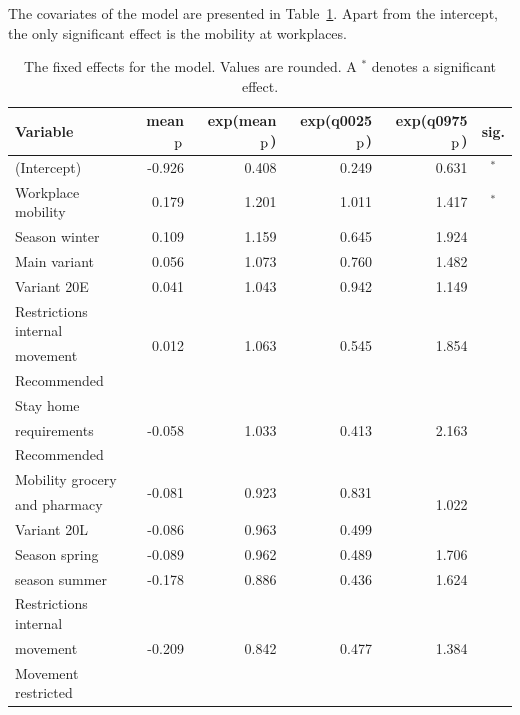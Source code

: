 The covariates of the model are presented in Table~\ref{fixed_norway_temporal}. Apart from the intercept, the only significant effect is the mobility at workplaces.
\begin{table}[H]
\caption{The fixed effects for the model. Values are rounded. A $^*$ denotes a significant effect. \label{fixed_norway_temporal}}
\begin{tabular}{l r r r r c}
\toprule
\textbf{Variable}	& \textbf{mean$_{\hbox{p}}$}	& \textbf{exp(mean$_{\hbox{p}}$)} & \textbf{exp(q0025$_{\hbox{p}}$)} & \textbf{exp(q0975$_{\hbox{p}}$)} & \textbf{sig.}\\
\midrule
(Intercept) & -0.926 & 0.408 & 0.249 & 0.631 & $^*$ \\
Workplace mobility & 0.179 & 1.201 & 1.011 & 1.417 & $^*$ \\
Season winter & 0.109 & 1.159 & 0.645 & 1.924 \\
Main variant & 0.056 & 1.073 & 0.760 & 1.482 \\
Variant 20E & 0.041 & 1.043 & 0.942 & 1.149 \\
Restrictions internal & \multirow{3}{*}{0.012} & \multirow{3}{*}{1.063} & \multirow{3}{*}{0.545}& \multirow{3}{*}{1.854}\\
movement \\
Recommended \\
Stay home & \multirow{3}{*}{-0.058} & \multirow{3}{*}{1.033} & \multirow{3}{*}{0.413}& \multirow{3}{*}{2.163}\\
requirements \\
Recommended \\
Mobility grocery & \multirow{2}{*}{-0.081} & \multirow{2}{*}{0.923} & \multirow{2}{*}{0.831}& \multirow{3}{*}{1.022}\\
and pharmacy \\
Variant 20L & -0.086 & 0.963& 0.499 & 1.684 \\
Season spring & -0.089 & 0.962 &0.489 & 1.706 \\
season summer & -0.178 & 0.886 & 0.436 & 1.624\\
Restrictions internal & \multirow{3}{*}{-0.209} & \multirow{3}{*}{0.842}& \multirow{3}{*}{0.477}& \multirow{3}{*}{1.384} \\
movement \\
Movement restricted \\
\bottomrule
\end{tabular}
\end{table}